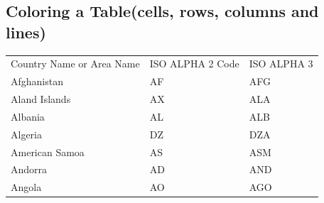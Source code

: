 \documentclass{article}
\begin{document}
\subsection*{Coloring a Table(cells, rows, columns  and lines)}
\begin{tabular}{ |s|p{3cm}|p{3cm}| }
	\hline
	  \\
	\hline
	Country Name or Area Name& ISO ALPHA 2 Code &ISO ALPHA 3 \\
	\hline
	Afghanistan & AF &AFG \\
	Aland Islands & AX & ALA \\
	Albania   &AL & ALB \\
	Algeria  &DZ & DZA \\
	American Samoa & AS & ASM \\
	Andorra & AD &  AND    \\
	Angola & AO & AGO \\
	\hline
\end{tabular}
  
\end{document}
